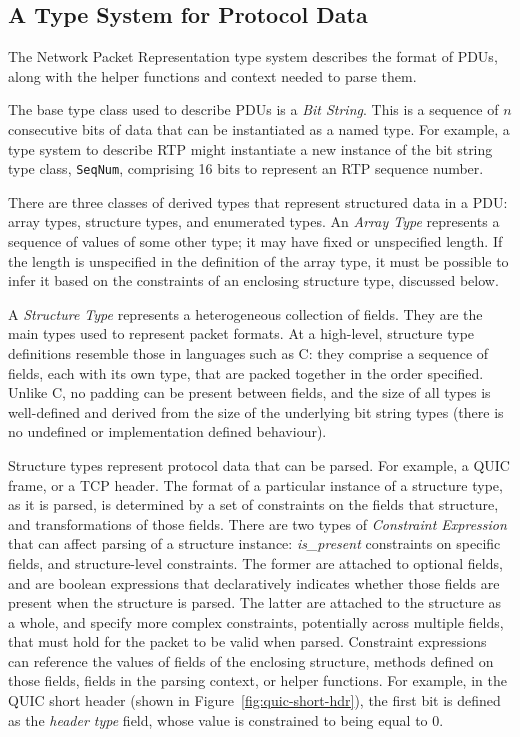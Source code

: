 \documentclass[10pt,sigconf]{acmart}
\begin{document}
\subsection{A Type System for Protocol Data}
\label{sec:npr-types}

The Network Packet Representation type system describes the format of PDUs,
along with the helper functions and context needed to parse them.

The base type class used to describe PDUs is a \emph{Bit String}.
This is a sequence of $n$ consecutive bits of data that can be instantiated
as a named type.
For example, a type system to describe RTP \cite{RFC3550} might instantiate
a new instance of the bit string type class, \texttt{SeqNum}, comprising 16
bits to represent an RTP sequence number.

There are three classes of derived types that represent structured data in
a PDU: array types, structure types, and enumerated types.
An \emph{Array Type} represents a sequence of values of some other type; 
it may have fixed or unspecified length. If the length is unspecified in
the definition of the array type, it must be possible to infer it based
on the constraints of an enclosing structure type, discussed below.

A \emph{Structure Type} represents a heterogeneous collection of fields.
They are the main types used to represent packet formats.
At a high-level, structure type definitions resemble those in
languages such as C: they comprise a sequence of fields, each with its own
type, that are packed together in the order specified. Unlike C, no padding
can be present between fields, and the size of all types is well-defined
and derived from the size of the underlying bit string types (there is no
undefined or implementation defined behaviour).

Structure types represent protocol data that can be parsed.
For example, a QUIC frame, or a TCP header.
The format of a particular instance of a structure type, as it is parsed,
is determined by a set of constraints on the fields that structure, and
transformations of those fields. 
There are two types of \emph{Constraint Expression} that can affect parsing
of a structure instance: \emph{is\_present} constraints on specific fields,
and structure-level constraints.
The former are attached to optional fields, and are boolean expressions
that declaratively indicates whether those fields are present when the
structure is parsed.
The latter are attached to the structure as a whole, and specify more
complex constraints, potentially across multiple fields, that must hold
for the packet to be valid when parsed. 
Constraint expressions can reference the values of fields of the enclosing
structure, methods defined on those fields, fields in the parsing context,
or helper functions. 
For example, in the QUIC short header (shown in Figure~\ref{fig:quic-short-hdr}), the
first bit is defined as the \emph{header type} field, whose value is constrained to being
equal to $0$.
\end{document}
